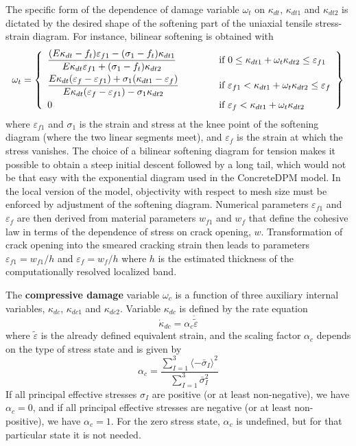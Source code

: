 \documentclass[a4paper]{article}
\begin{document}
The specific form of the dependence of damage variable $\omega_t$ on 
$\kappa_{dt}$, $\kappa_{dt1}$ and $\kappa_{dt2}$ is dictated by the desired
shape of the softening part of the uniaxial tensile stress-strain diagram.
For instance, bilinear softening is obtained with
\begin{equation}\label{cdpm2:omegat}
  \omega_t = \left\{\begin{array}{ll}
  \dfrac{(E\kappa_{dt}-f_t)\varepsilon_{f1}-(\sigma_1-f_t)\kappa_{dt1}}{E\kappa_{dt}\varepsilon_{f1}+(\sigma_1-f_t)\kappa_{dt2}} & \hskip 10mm \mbox{ if } 0\le\kappa_{dt1}+\omega_t\kappa_{dt2}\le\varepsilon_{f1}
  \\[3mm]
    \dfrac{E\kappa_{dt}(\varepsilon_f-\varepsilon_{f1})+\sigma_1(\kappa_{dt1}-\varepsilon_f)}{E\kappa_{dt}(\varepsilon_f-\varepsilon_{f1})-\sigma_1\kappa_{dt2}} & \hskip 10mm \mbox{ if } \varepsilon_{f1}<\kappa_{dt1}+\omega_t\kappa_{dt2}\le\varepsilon_{f}
    \\[3mm]
    0 & \hskip 10mm \mbox{ if } \varepsilon_{f}<\kappa_{dt1}+\omega_t\kappa_{dt2}
  \end{array}\right\}
\end{equation}
where $\varepsilon_{f1}$ and $\sigma_1$ is the strain and stress at the knee point
of the softening diagram (where the two linear segments meet), and $\varepsilon_{f}$
is the strain at which the stress vanishes. The choice of a bilinear softening
diagram for tension makes it possible to obtain a steep initial descent
followed by a long tail, which would not be that easy with the exponential diagram
used in the ConcreteDPM model. In the local version of the model, objectivity
with respect to mesh size must be enforced by adjustment of the softening diagram.
Numerical parameters $\varepsilon_{f1}$ and $\varepsilon_{f}$ are then derived from material
parameters $w_{f1}$ and $w_f$ that define the cohesive law in terms of the dependence of stress
on crack opening, $w$. Transformation of crack opening into the smeared cracking strain
then leads to parameters $\varepsilon_{f1}=w_{f1}/h$ and $\varepsilon_{f}=w_f/h$ where
$h$ is the estimated thickness of the computationally resolved localized band.

The {\bf compressive damage} variable $\omega_c$ is a function of three auxiliary
internal variables, $\kappa_{dc}$, $\kappa_{dc1}$ and $\kappa_{dc2}$.
Variable $\kappa_{dc}$ is defined by the rate equation
\begin{equation}
  \dot\kappa_{dc} = \alpha_c\dot{\tilde\varepsilon}
\end{equation}
where $\tilde\varepsilon$ is the already defined equivalent strain, and
the scaling factor $\alpha_c$ depends on the type of stress state
and is given by
\begin{equation}
  \alpha_c = \frac{\sum_{I=1}^3 \langle-\bar\sigma_I\rangle^2}{\sum_{I=1}^3 \bar\sigma_I^2}
\end{equation}
If all principal effective stresses $\sigma_I$ are positive (or at least non-negative),
we have $\alpha_c=0$, and if all principal effective stresses are negative (or at least non-positive),
we have $\alpha_c=1$. For the zero stress state, $\alpha_c$ is undefined, but for that
particular state it is not needed. 
\end{document}
